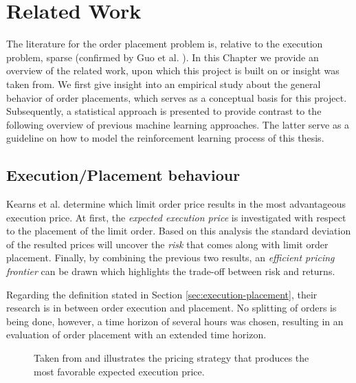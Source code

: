 \chapter{Related Work}
\label{chap:related-work}

The literature for the order placement problem is, relative to the execution problem, sparse (confirmed by Guo et al. \cite{guo2013optimal}).
In this Chapter we provide an overview of the related work, upon which this project is built on or insight was taken from.
We first give insight into an empirical study about the general behavior of order placements, which serves as a conceptual basis for this project.
Subsequently, a statistical approach is presented to provide contrast to the following overview of previous machine learning approaches.
The latter serve as a guideline on how to model the reinforcement learning process of this thesis.

\section{Execution/Placement behaviour}

Kearns et al. \cite{nevmyvaka2005electronic} determine which limit order price results in the most advantageous execution price.
At first, the \textit{expected execution price} is investigated with respect to the placement of the limit order. 
Based on this analysis the standard deviation of the resulted prices will uncover the \textit{risk} that comes along with limit order placement. 
Finally, by combining the previous two results, an \textit{efficient pricing frontier} can be drawn which highlights the trade-off between risk and returns.

Regarding the definition stated in Section \ref{sec:execution-placement}, their research is in between order execution and placement.
No splitting of orders is being done, however, a time horizon of several hours was chosen, resulting in an evaluation of order placement with an extended time horizon.

\begin{figure}[H]
    \centering
    \caption{Taken from \cite{nevmyvaka2005electronic} and illustrates the pricing strategy that produces the most favorable expected execution price.}
    \label{fig:kearns-return}
\end{figure}

